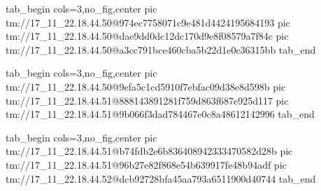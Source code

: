 \ifcmt
  tab_begin cols=3,no_fig,center
    pic tm://17_11_22.18.44.50@974ec7758071c9e481d4424195684193
    pic tm://17_11_22.18.44.50@dae9dd0dc12dc170d9e8f08579a7f84c
    pic tm://17_11_22.18.44.50@a3cc791bce460cba5b22d1e0c36315bb
  tab_end
\fi


\ifcmt
  tab_begin cols=3,no_fig,center
    pic tm://17_11_22.18.44.50@9efa5c1cd5910f7ebfac09d38e8d598b
    pic tm://17_11_22.18.44.51@888143891281f759d863f687e925d117
    pic tm://17_11_22.18.44.51@9b066f3dad784467e0c8a48612142996
  tab_end
\fi


\ifcmt
  tab_begin cols=3,no_fig,center
    pic tm://17_11_22.18.44.51@b74fdb2e6b836408942333470582d28b
    pic tm://17_11_22.18.44.51@96b27e82f868e54b639917fe48b94adf
    pic tm://17_11_22.18.44.52@dcb92728bfa45aa793a6511900d40744
  tab_end
\fi

